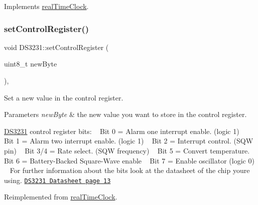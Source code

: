 Implements \mbox{\hyperlink{classreal_time_clock_a448cbe8ab7f6649ee32eeb415721707f}{real\+Time\+Clock}}.

\mbox{\label{class_d_s3231_a1151a22a8dd47470b22562cedae114e9}} 
\subsubsection{\texorpdfstring{set\+Control\+Register()}{setControlRegister()}}
{\footnotesize\ttfamily void D\+S3231\+::set\+Control\+Register (\begin{DoxyParamCaption}\item[{uint8\+\_\+t}]{new\+Byte }\end{DoxyParamCaption})\hspace{0.3cm}{\ttfamily [override]}, {\ttfamily [virtual]}}



Set a new value in the control register. 


\begin{DoxyParams}{Parameters}
{\em new\+Byte} & the new value you want to store in the control register.\\
\hline
\end{DoxyParams}
\mbox{\hyperlink{class_d_s3231}{D\+S3231}} control register bits\+: ~\newline
 Bit 0 = Alarm one interrupt enable. (logic 1) ~\newline
 Bit 1 = Alarm two interrupt enable. (logic 1) ~\newline
 Bit 2 = Interrupt control. (S\+QW pin) ~\newline
 Bit 3/4 = Rate select. (S\+QW frequency) ~\newline
 Bit 5 = Convert temperature. ~\newline
 Bit 6 = Battery-\/\+Backed Square-\/\+Wave enable ~\newline
 Bit 7 = Enable oscillator (logic 0) ~\newline
 For further information about the bits look at the datasheet of the chip you\textquotesingle{}re using. \href{https://datasheets.maximintegrated.com/en/ds/DS3231.pdf}{\tt D\+S3231 Datasheet page 13} 

Reimplemented from \mbox{\hyperlink{classreal_time_clock_ab4034ba75fb65a55fb725c37e89f7626}{real\+Time\+Clock}}.

